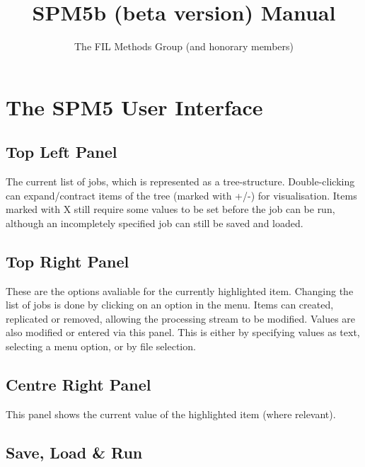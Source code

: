 \documentclass[a4paper,titlepage]{book}
\title{\huge{SPM5b (beta version) Manual}}
\author{The FIL Methods Group (and honorary members)}
\begin{document}
\maketitle
\dominitoc\tableofcontents

\newpage
\section*{The SPM5 User Interface}

\subsection*{Top Left Panel}

The current list of jobs, which is represented as a tree-structure. Double-clicking can expand/contract items of the tree (marked with +/-) for visualisation. Items marked with X still require some values to be set before the job can be run, although an incompletely specified job can still be saved and loaded.




\subsection*{Top Right Panel}

These are the options avaliable for the currently highlighted item. Changing the list of jobs is done by clicking on an option in the menu. Items can created, replicated or removed, allowing the processing stream to be modified. Values are also modified or entered via this panel. This is either by specifying values as text, selecting a menu option, or by file selection.




\subsection*{Centre Right Panel}

This panel shows the current value of the highlighted item (where relevant).




\subsection*{Save, Load \& Run}
\end{document}
